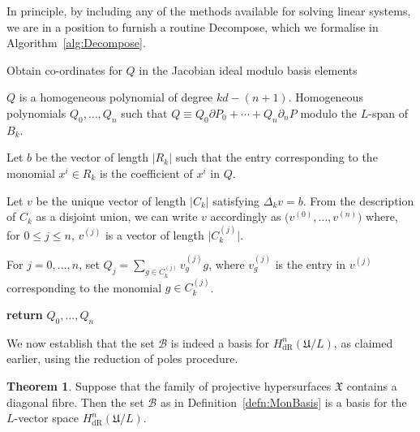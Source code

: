 \documentclass[a4paper,11pt]{article}
\numberwithin{equation}{section}
\providecommand{\abs}[1]{\lvert#1\rvert}                 %
\providecommand{\HdR}{H_{\text{dR}}}    %
\providecommand{\cB}{\mathcal{B}} %
\theoremstyle{definition}
\newtheorem{thm}{Theorem}[section]
\begin{document}
In principle, by including any of the methods available for solving linear 
systems, we are in a position to furnish a routine {\sc Decompose}, which 
we formalise in Algorithm~\ref{alg:Decompose}.

\begin{algorithm}[ht]
\caption{Obtain co-ordinates for $Q$ in the Jacobian ideal modulo basis elements}
\label{alg:Decompose}
\begin{algorithmic}
\Require $Q$ is a homogeneous polynomial of degree $kd - (n+1)$.
\Ensure  Homogeneous polynomials $Q_0, \dotsc, Q_n$ such that 
         $Q \equiv Q_0 \partial P_0 + \dotsb + Q_n \partial_n P$ modulo the 
         $L$-span of $B_k$.
\State \begin{compactenum}[\it {Step} I.] \vspace{-1.24em}
\item Let $b$ be the vector of length $\abs{R_k}$ such that the entry 
      corresponding to the monomial $x^i \in R_k$ is the coefficient of 
      $x^i$ in $Q$.
\item Let $v$ be the unique vector of length $\abs{C_k}$ satisfying 
      $\Delta_k v = b$.  From the description of $C_k$ as a disjoint union, 
      we can write $v$ accordingly as $\bigl(v^{(0)}, \dotsc, v^{(n)}\bigr)$ 
      where, for $0 \leq j \leq n$, $v^{(j)}$ is a vector of length 
      $\abs{C_k^{(j)}}$.
\item For $j = 0, \dotsc, n$, set $Q_j = \sum_{g \in C_k^{(j)}} v_g^{(j)} g$,
      where $v_g^{(j)}$ is the entry in $v^{(j)}$ corresponding to the 
      monomial $g \in C_k^{(j)}$.
\item \textbf{return} $Q_0, \dotsc, Q_n$
\end{compactenum}
\EndProcedure
\end{algorithmic}
\end{algorithm}

We now establish that the set $\cB$ is indeed a basis for 
$\HdR^n(\mathfrak{U}/L)$, as claimed earlier, using the 
reduction of poles procedure.

\begin{thm} \label{thm:Basis}
Suppose that the family of projective hypersurfaces $\mathfrak{X}$ contains 
a diagonal fibre.  Then the set $\cB$ as in Definition~\ref{defn:MonBasis} 
is a basis for the $L$-vector space $\HdR^n(\mathfrak{U}/L)$.
\end{thm}
\end{document}
